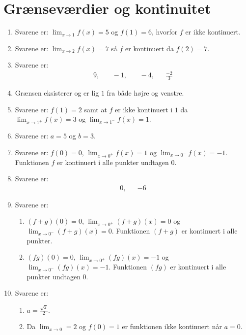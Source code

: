 \section{Grænseværdier og kontinuitet}
\begin{enumerate}
	\item Svarene er: $\lim_{x\to 1}f(x)=5$ og $f(1)=6$, hvorfor $f$ er ikke kontinuert.
	
	
	\item Svarene er: $\lim_{x\to 2}f(x)=7$ så $f$ er kontinuert da $ f(2)=7 $.

	
	
	\item Svarene er:
	\begin{align*}
	9,&& \ -1,&&\ -4,&& \frac{-2}{3}
	\end{align*}
	


	
	
	\item Grænsen eksisterer og er lig $1$ fra både højre og venstre.
	
	\item Svarene er: $f(1)=2$ samt at $f$ er ikke kontinuert i $1$ da $\lim_{x\to 1^+}f(x)=3$ og $\lim_{x\to 1^-}f(x)=1$.
	
	
	\item Svarene er: $a=5$ og $b=3$.
	
	\item\label{it:lim2ans} Svarene er: $ f(0) =0$, $ \lim_{x\to 0^+}f(x)=1 $ og $\lim_{x\to 0^-}f(x)=-1$. Funktionen $f$ er kontinuert i alle punkter undtagen $0$.
	
	\item Svarene er:
	\begin{align*}
	0,&& -6
	\end{align*}
	
	\item Svarene er: 
	\begin{enumerate}
		\item $ (f+g)(0)=0$, $ \lim_{x\to 0^+}(f+g)(x)=0 $ og $\lim_{x\to 0^-}(f+g)(x)=0$. Funktionen $(f+g)$ er kontinuert i alle punkter.
		\item $ (fg)(0) =0$, $ \lim_{x\to 0^+}(fg)(x) =-1$ og $\lim_{x\to 0^-}(fg)(x)=-1$. Funktionen $(fg)$ er kontinuert i alle punkter undtagen $0$.
	\end{enumerate}
	
	\item Svarene er:
	\begin{enumerate}
		\item $a=\frac{\sqrt{2}}{2}$.
		\item Da $\lim_{x\to 0}=2$ og $f(0)=1$ er funktionen ikke kontinuert når $a=0$.
	\end{enumerate}


\end{enumerate}
